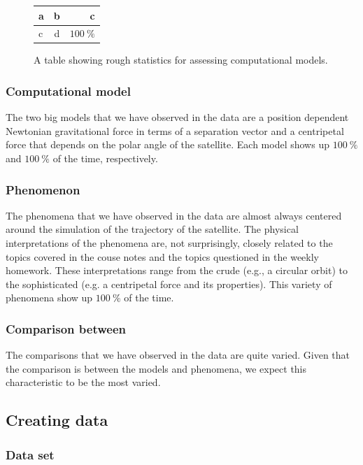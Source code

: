 \documentclass{msuphddissertation}
\begin{document}
\begin{doublespace}
\begin{figure}[ht]\centering
\begin{tabular}{l|c|r}
a & b & c \\\hline
c & d & $\SI{100}{\percent}$ \\
\end{tabular}
\caption{A table showing rough statistics for assessing computational models.}\label{CH5:AssessingComputationalModels}
\end{figure}

\subsubsection{Computational model}

The two big models that we have observed in the data are a position dependent Newtonian gravitational force in terms of a separation vector and a centripetal force that depends on the polar angle of the satellite.  Each model shows up $\SI{100}{\percent}$ and $\SI{100}{\percent}$ of the time, respectively.

\subsubsection{Phenomenon}

The phenomena that we have observed in the data are almost always centered around the simulation of the trajectory of the satellite.  The physical interpretations of the phenomena are, not surprisingly, closely related to the topics covered in the couse notes and the topics questioned in the weekly homework.  These interpretations range from the crude (e.g., a circular orbit) to the sophisticated (e.g. a centripetal force and its properties).  This variety of phenomena show up $\SI{100}{\percent}$ of the time.

\subsubsection{Comparison between}

The comparisons that we have observed in the data are quite varied.  Given that the comparison is between the models and phenomena, we expect this characteristic to be the most varied.

\subsection{Creating data}

\subsubsection{Data set}


\end{doublespace}
\end{document}

